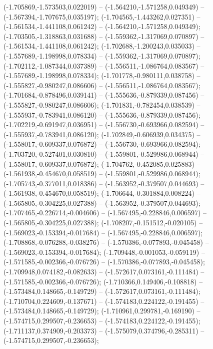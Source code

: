 (-1.705869,-1.573503,0.022019) -- (-1.564210,-1.571258,0.049349) -- (-1.567394,-1.707675,0.035197);
 (-1.704565,-1.443262,0.027351) -- (-1.561534,-1.441108,0.061242) -- (-1.564210,-1.571258,0.049349);
 (-1.703505,-1.318863,0.031688) -- (-1.559362,-1.317069,0.070897) -- (-1.561534,-1.441108,0.061242);
 (-1.702688,-1.200243,0.035033) -- (-1.557689,-1.198998,0.078334) -- (-1.559362,-1.317069,0.070897);
 (-1.702112,-1.087344,0.037389) -- (-1.556511,-1.086764,0.083567) -- (-1.557689,-1.198998,0.078334);
 (-1.701778,-0.980111,0.038758) -- (-1.555827,-0.980247,0.086606) -- (-1.556511,-1.086764,0.083567);
 (-1.701684,-0.878496,0.039141) -- (-1.555636,-0.879339,0.087456) -- (-1.555827,-0.980247,0.086606);
 (-1.701831,-0.782454,0.038539) -- (-1.555937,-0.783941,0.086120) -- (-1.555636,-0.879339,0.087456);
 (-1.702219,-0.691947,0.036951) -- (-1.556730,-0.693966,0.082594) -- (-1.555937,-0.783941,0.086120);
 (-1.702849,-0.606939,0.034375) -- (-1.558017,-0.609337,0.076872) -- (-1.556730,-0.693966,0.082594);
 (-1.703720,-0.527401,0.030810) -- (-1.559801,-0.529986,0.068944) -- (-1.558017,-0.609337,0.076872);
 (-1.704762,-0.452085,0.025883) -- (-1.561938,-0.454670,0.058519) -- (-1.559801,-0.529986,0.068944);
 (-1.705743,-0.377011,0.018386) -- (-1.563952,-0.379507,0.044693) -- (-1.561938,-0.454670,0.058519);
 (-1.706644,-0.301884,0.008224) -- (-1.565805,-0.304225,0.027388) -- (-1.563952,-0.379507,0.044693);
 (-1.707465,-0.226714,-0.004606) -- (-1.567495,-0.228846,0.006597) -- (-1.565805,-0.304225,0.027388);
 (-1.708207,-0.151512,-0.020105) -- (-1.569023,-0.153394,-0.017684) -- (-1.567495,-0.228846,0.006597);
 (-1.708868,-0.076288,-0.038276) -- (-1.570386,-0.077893,-0.045458) -- (-1.569023,-0.153394,-0.017684);
 (-1.709448,-0.001053,-0.059119) -- (-1.571585,-0.002366,-0.076726) -- (-1.570386,-0.077893,-0.045458);
 (-1.709948,0.074182,-0.082633) -- (-1.572617,0.073161,-0.111484) -- (-1.571585,-0.002366,-0.076726);
 (-1.710366,0.149406,-0.108818) -- (-1.573484,0.148665,-0.149729) -- (-1.572617,0.073161,-0.111484);
 (-1.710704,0.224609,-0.137671) -- (-1.574183,0.224122,-0.191455) -- (-1.573484,0.148665,-0.149729);
 (-1.710961,0.299781,-0.169190) -- (-1.574715,0.299507,-0.236653) -- (-1.574183,0.224122,-0.191455);
 (-1.711137,0.374909,-0.203373) -- (-1.575079,0.374796,-0.285311) -- (-1.574715,0.299507,-0.236653);
